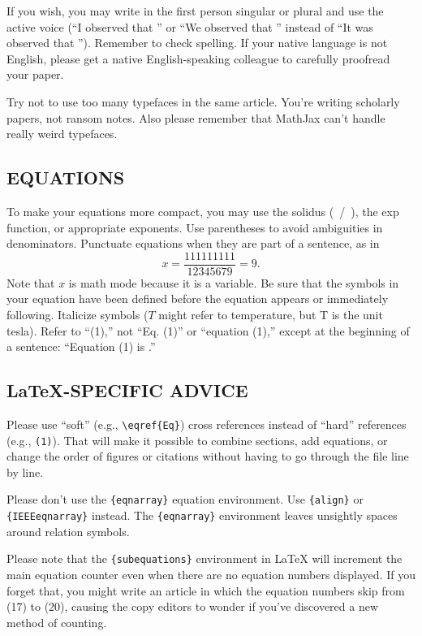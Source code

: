 \documentclass{IEEEoj}
\begin{document}
If you wish, you may write in the first person singular or plural and use 
the active voice (``I observed that \textellipsis'' or ``We observed that \textellipsis'' 
instead of ``It was observed that \textellipsis''). Remember to check spelling. If 
your native language is not English, please get a native English-speaking 
colleague to carefully proofread your paper.

Try not to use too many typefaces in the same article. You're writing
scholarly papers, not ransom notes. Also please remember that MathJax
can't handle really weird typefaces.

\subsection{EQUATIONS}
To make your equations more 
compact, you may use the solidus (~/~), the exp function, or appropriate 
exponents. Use parentheses to avoid ambiguities in denominators. Punctuate 
equations when they are part of a sentence, as in
\begin{equation}
\label{eq1}
x=\frac{111111111}{12345679}=9 .
\end{equation}
Note that $x$ is math mode because it is a variable. 
Be sure that the symbols in your equation have been defined before the 
equation appears or immediately following. Italicize symbols ($T$ might refer 
to temperature, but T is the unit tesla). Refer to ``(1),'' not ``Eq. (1)'' 
or ``equation (1),'' except at the beginning of a sentence: ``Equation (1) 
is \textellipsis .''

\subsection{\LaTeX-SPECIFIC ADVICE}

Please use ``soft'' (e.g., \verb|\eqref{Eq}|) cross references instead
of ``hard'' references (e.g., \verb|(1)|). That will make it possible
to combine sections, add equations, or change the order of figures or
citations without having to go through the file line by line.

Please don't use the \verb|{eqnarray}| equation environment. Use
\verb|{align}| or \verb|{IEEEeqnarray}| instead. The \verb|{eqnarray}|
environment leaves unsightly spaces around relation symbols.

Please note that the \verb|{subequations}| environment in {\LaTeX}
will increment the main equation counter even when there are no
equation numbers displayed. If you forget that, you might write an
article in which the equation numbers skip from (17) to (20), causing
the copy editors to wonder if you've discovered a new method of
counting.
\end{document}
